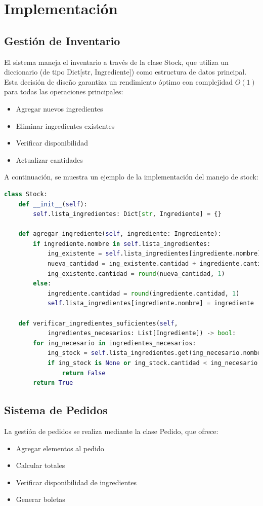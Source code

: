 \documentclass[12pt,letterpaper]{article}
\begin{document}
\section{Implementación}
\subsection{Gestión de Inventario}
El sistema maneja el inventario a través de la clase Stock, que utiliza un diccionario (de tipo Dict[str, Ingrediente]) como estructura de datos principal. Esta decisión de diseño garantiza un rendimiento óptimo con complejidad $O(1)$ para todas las operaciones principales:

\begin{itemize}
    \item Agregar nuevos ingredientes
    \item Eliminar ingredientes existentes
    \item Verificar disponibilidad
    \item Actualizar cantidades
\end{itemize}

A continuación, se muestra un ejemplo de la implementación del manejo de stock:

\begin{lstlisting}[language=Python, caption=Implementación de Stock]
class Stock:
    def __init__(self):
        self.lista_ingredientes: Dict[str, Ingrediente] = {}

    def agregar_ingrediente(self, ingrediente: Ingrediente):
        if ingrediente.nombre in self.lista_ingredientes:
            ing_existente = self.lista_ingredientes[ingrediente.nombre]
            nueva_cantidad = ing_existente.cantidad + ingrediente.cantidad
            ing_existente.cantidad = round(nueva_cantidad, 1)
        else:
            ingrediente.cantidad = round(ingrediente.cantidad, 1)
            self.lista_ingredientes[ingrediente.nombre] = ingrediente

    def verificar_ingredientes_suficientes(self, 
            ingredientes_necesarios: List[Ingrediente]) -> bool:
        for ing_necesario in ingredientes_necesarios:
            ing_stock = self.lista_ingredientes.get(ing_necesario.nombre)
            if ing_stock is None or ing_stock.cantidad < ing_necesario.cantidad:
                return False
        return True
\end{lstlisting}

\subsection{Sistema de Pedidos}
La gestión de pedidos se realiza mediante la clase Pedido, que ofrece:
\begin{itemize}
    \item Agregar elementos al pedido
    \item Calcular totales
    \item Verificar disponibilidad de ingredientes
    \item Generar boletas
\end{itemize}
\end{document}
